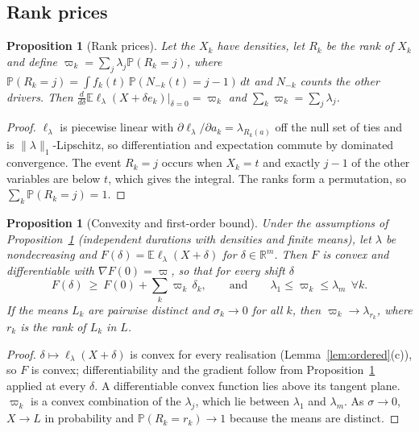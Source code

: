 \documentclass[11pt]{article}
\newtheorem{proposition}[theorem]{Proposition}
\theoremstyle{definition}
\newcommand{\E}{\mathbb{E}}
\newcommand{\Prob}{\mathbb{P}}
\newcommand{\lord}{\ell_\lambda}
\begin{document}
\subsection{Rank prices}\label{sec:th:prices}

\begin{proposition}[Rank prices]\label{prop:prices}
Let the $X_k$ have densities, let $R_k$ be the rank of $X_k$ and define
$\varpi_k=\sum_j\lambda_j\Prob(R_k=j)$, where
$\Prob(R_k=j)=\int f_k(t)\,\Prob(N_{-k}(t)=j-1)\,dt$ and $N_{-k}$ counts the
other drivers. Then
$\frac{d}{d\delta}\E\lord(X+\delta e_k)\big|_{\delta=0}=\varpi_k$ and
$\sum_k\varpi_k=\sum_j\lambda_j$.
\end{proposition}
\begin{proof}
$\lord$ is piecewise linear with $\partial\lord/\partial a_k=\lambda_{R_k(a)}$
off the null set of ties and is $\|\lambda\|_1$-Lipschitz, so differentiation
and expectation commute by dominated convergence. The event $R_k=j$ occurs
when $X_k=t$ and exactly $j-1$ of the other variables are below $t$, which
gives the integral. The ranks form a permutation, so $\sum_k\Prob(R_k=j)=1$.
\end{proof}

\begin{proposition}[Convexity and first-order bound]\label{prop:convex}
Under the assumptions of Proposition~\ref{prop:prices} (independent
durations with densities and finite means), let $\lambda$ be nondecreasing
and $F(\delta)=\E\lord(X+\delta)$ for
$\delta\in\mathbb{R}^m$. Then $F$ is convex and differentiable with
$\nabla F(0)=\varpi$, so that for every shift $\delta$
\[
F(\delta)\ \ge\ F(0)+\sum_k\varpi_k\,\delta_k ,
\qquad\text{and}\qquad \lambda_1\le\varpi_k\le\lambda_m\ \ \forall k .
\]
If the means $L_k$ are pairwise distinct and $\sigma_k\to0$ for all $k$, then
$\varpi_k\to\lambda_{r_k}$, where $r_k$ is the rank of $L_k$ in $L$.
\end{proposition}
\begin{proof}
$\delta\mapsto\lord(X+\delta)$ is convex for every realisation
(Lemma~\ref{lem:ordered}(c)), so $F$ is convex; differentiability and the
gradient follow from Proposition~\ref{prop:prices} applied at every $\delta$.
A differentiable convex function lies above its tangent plane. $\varpi_k$ is a
convex combination of the $\lambda_j$, which lie between $\lambda_1$ and
$\lambda_m$. As $\sigma\to0$, $X\to L$ in probability and $\Prob(R_k=r_k)\to1$
because the means are distinct.
\end{proof}
\end{document}

